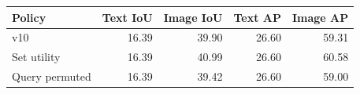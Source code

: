 \begin{tabular}{lrrrr}
\toprule
Policy & Text IoU & Image IoU & Text AP & Image AP \\
\midrule
v10 & 16.39 & 39.90 & 26.60 & 59.31 \\
Set utility & 16.39 & 40.99 & 26.60 & 60.58 \\
Query permuted & 16.39 & 39.42 & 26.60 & 59.00 \\
\bottomrule
\end{tabular}
